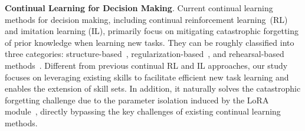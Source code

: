 \textbf{Continual Learning for Decision Making}.
Current continual learning methods for decision making, including continual reinforcement learning~(RL) and imitation learning (IL), primarily focus on mitigating catastrophic forgetting of prior knowledge when learning new tasks. They can be roughly classified into three categories: structure-based~\citep{smith2023continual, wang2024sparse},  regularization-based~\citep{kessler2020unclear}, and rehearsal-based methods~\citep{liu2024continual, peng2023ideal}. Different from previous continual RL and IL approaches, our study focuses on leveraging existing skills to facilitate efficient new task learning and enables the extension of skill sets. In addition, it naturally solves the catastrophic forgetting challenge due to the parameter isolation induced by the LoRA module~\citep{liu2023tail}, directly bypassing the key challenges of existing continual learning methods. 





\vspace{-8pt}